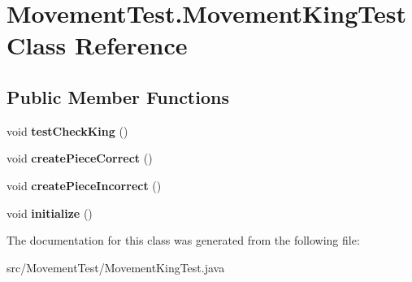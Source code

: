 \hypertarget{class_movement_test_1_1_movement_king_test}{\section{Movement\-Test.\-Movement\-King\-Test Class Reference}
\label{class_movement_test_1_1_movement_king_test}
}
\subsection*{Public Member Functions}
\begin{DoxyCompactItemize}
\item 
\hypertarget{class_movement_test_1_1_movement_king_test_a581051c42689c090d7c0febaf860f1ec}{void {\bfseries test\-Check\-King} ()}\label{class_movement_test_1_1_movement_king_test_a581051c42689c090d7c0febaf860f1ec}

\item 
\hypertarget{class_movement_test_1_1_movement_king_test_a56fec250729567b517cf5edb9858e52a}{void {\bfseries create\-Piece\-Correct} ()}\label{class_movement_test_1_1_movement_king_test_a56fec250729567b517cf5edb9858e52a}

\item 
\hypertarget{class_movement_test_1_1_movement_king_test_abec85d36db77e84c1f8ad1d3ff45392b}{void {\bfseries create\-Piece\-Incorrect} ()}\label{class_movement_test_1_1_movement_king_test_abec85d36db77e84c1f8ad1d3ff45392b}

\item 
\hypertarget{class_movement_test_1_1_movement_king_test_a52a4c793e306d3990300083b931185b0}{void {\bfseries initialize} ()}\label{class_movement_test_1_1_movement_king_test_a52a4c793e306d3990300083b931185b0}

\end{DoxyCompactItemize}


The documentation for this class was generated from the following file\-:\begin{DoxyCompactItemize}
\item 
src/\-Movement\-Test/Movement\-King\-Test.\-java\end{DoxyCompactItemize}
